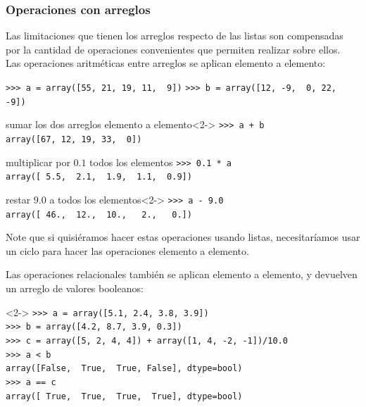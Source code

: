 \begin{frame}[fragile]
\frametitle{Operaciones con arreglos}
Las limitaciones que tienen los arreglos respecto de las listas son compensadas por la cantidad de operaciones convenientes que permiten realizar sobre ellos.
\\
\bigskip
Las operaciones aritméticas entre arreglos se aplican elemento a elemento:
\fontsize{12}{12}\selectfont
\begin{exampleblock}{}
\verb|>>> a = array([55, 21, 19, 11,  9])|
\verb|>>> b = array([12, -9,  0, 22, -9])|
\end{exampleblock}
\begin{exampleblock}{sumar los dos arreglos elemento a elemento}<2->
\verb|>>> a + b| \\
\verb|array([67, 12, 19, 33,  0])|
\end{exampleblock}
\end{frame}
\begin{frame}[fragile]
\begin{exampleblock}{multiplicar por $0.1$ todos los elementos}
\verb|>>> 0.1 * a| \\
\verb|array([ 5.5,  2.1,  1.9,  1.1,  0.9])|
\end{exampleblock}
\begin{exampleblock}{restar $9.0$ a todos los elementos}<2->
\verb|>>> a - 9.0| \\
\verb|array([ 46.,  12.,  10.,   2.,   0.])|
\end{exampleblock}
Note que si quisiéramos hacer estas operaciones usando listas, necesitaríamos usar un ciclo para hacer las operaciones elemento a elemento.
\end{frame}
\begin{frame}[fragile]
Las operaciones relacionales también se aplican elemento a elemento, y devuelven un arreglo de valores booleanos:
\fontsize{12}{12}\selectfont
\begin{exampleblock}{}<2->
\verb|>>> a = array([5.1, 2.4, 3.8, 3.9])| \\
\verb|>>> b = array([4.2, 8.7, 3.9, 0.3])| \\
\verb|>>> c = array([5, 2, 4, 4]) + array([1, 4, -2, -1])/10.0|\\
\pause
\verb|>>> a < b| \\
\pause
\verb|array([False,  True,  True, False], dtype=bool)| \\
\pause
\verb|>>> a == c| \\
\pause
\verb|array([ True,  True,  True,  True], dtype=bool)|
\end{exampleblock}
\end{frame}
